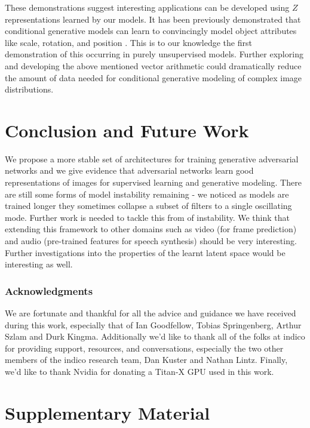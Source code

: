 \documentclass{article} %
\begin{document}
These demonstrations suggest interesting applications can be developed using $Z$ representations learned by our models. It has been previously demonstrated that conditional generative models can learn to convincingly model object attributes like scale, rotation, and position \citep{dosovitskiy2014learning}. This is to our knowledge the first demonstration of this occurring in purely unsupervised models. Further exploring and developing the above mentioned vector arithmetic could dramatically reduce the amount of data needed for conditional generative modeling of complex image distributions.




\section{Conclusion and Future Work}

We propose a more stable set of architectures for training generative adversarial networks and we give evidence that adversarial networks learn good representations of images for supervised learning and generative modeling. There are still some forms of model instability remaining - we noticed as models are trained longer they sometimes collapse a subset of filters to a single oscillating mode. Further work is needed to tackle this from of instability. We think that extending this framework to other domains such as video (for frame prediction) and audio (pre-trained features for speech synthesis) should be very interesting. Further investigations into the properties of the learnt latent space would be interesting as well.
\subsubsection*{Acknowledgments}

We are fortunate and thankful for all the advice and guidance we have received during this work, especially that of Ian Goodfellow, Tobias Springenberg, Arthur Szlam and Durk Kingma. Additionally we'd like to thank all of the folks at indico for providing support, resources, and conversations, especially the two other members of the indico research team, Dan Kuster and Nathan Lintz. Finally, we'd like to thank Nvidia for donating a Titan-X GPU used in this work.




\newpage

\section{Supplementary Material}
\end{document}
